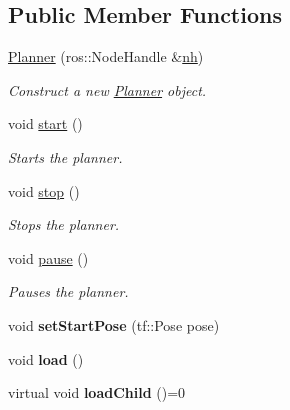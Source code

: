 \subsection*{Public Member Functions}
\begin{DoxyCompactItemize}
\item 
\hyperlink{classPlanner_a32475baddd401921adb1aab3ab842210}{Planner} (ros\+::\+Node\+Handle \&\hyperlink{classPlanner_a9714d036f444a07ce90be8d135b9a40c}{nh})
\begin{DoxyCompactList}\small\item\em Construct a new \hyperlink{classPlanner}{Planner} object. \end{DoxyCompactList}\item 
void \hyperlink{classPlanner_a6c1c8d67d0cac41f738b413d1833c007}{start} ()\hypertarget{classPlanner_a6c1c8d67d0cac41f738b413d1833c007}{}\label{classPlanner_a6c1c8d67d0cac41f738b413d1833c007}

\begin{DoxyCompactList}\small\item\em Starts the planner. \end{DoxyCompactList}\item 
void \hyperlink{classPlanner_a3d0a3d404d39f59bfc21f275b0da408a}{stop} ()\hypertarget{classPlanner_a3d0a3d404d39f59bfc21f275b0da408a}{}\label{classPlanner_a3d0a3d404d39f59bfc21f275b0da408a}

\begin{DoxyCompactList}\small\item\em Stops the planner. \end{DoxyCompactList}\item 
void \hyperlink{classPlanner_a400f2aefad591e55a62e0fb13cb02521}{pause} ()\hypertarget{classPlanner_a400f2aefad591e55a62e0fb13cb02521}{}\label{classPlanner_a400f2aefad591e55a62e0fb13cb02521}

\begin{DoxyCompactList}\small\item\em Pauses the planner. \end{DoxyCompactList}\item 
void {\bfseries set\+Start\+Pose} (tf\+::\+Pose pose)\hypertarget{classPlanner_aded03846e91b52e042545c947da63644}{}\label{classPlanner_aded03846e91b52e042545c947da63644}

\item 
void {\bfseries load} ()\hypertarget{classPlanner_a935f2412dc213ffa0144032722c8ead0}{}\label{classPlanner_a935f2412dc213ffa0144032722c8ead0}

\item 
virtual void {\bfseries load\+Child} ()=0\hypertarget{classPlanner_ad7b6fdf2a9ffb8669e5154f83b264f72}{}\label{classPlanner_ad7b6fdf2a9ffb8669e5154f83b264f72}

\end{DoxyCompactItemize}
